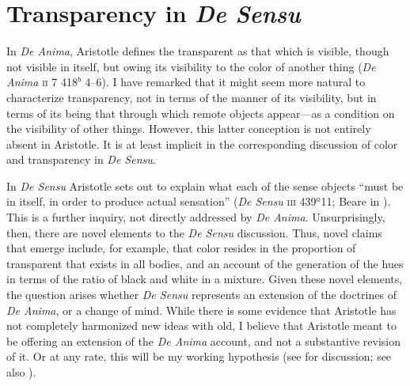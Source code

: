 
\section{Transparency in \emph{De Sensu}} %
\label{sec:transparency_in_de_sensu}

In \emph{De Anima}, Aristotle defines the transparent as that which is visible, though not visible in itself, but owing its visibility to the color of another thing (\emph{De Anima} \textsc{ii} 7 418\( ^{b} \) 4--6). I have remarked that it might seem more natural to characterize transparency, not in terms of the manner of its visibility, but in terms of its being that through which remote objects appear---as a condition on the visibility of other things. However, this latter conception is not entirely absent in Aristotle. It is at least implicit in the corresponding discussion of color and transparency in \emph{De Sensu}.

In \emph{De Sensu} Aristotle sets out to explain what each of the sense objects ``must be in itself, in order to produce actual sensation'' (\emph{De Sensu} \textsc{iii} 439\( ^{a} \)11; Beare in \citealt[7]{Barnes:1984uq}). This is a further inquiry, not directly addressed by \emph{De Anima}. Unsurprisingly, then, there are novel elements to the \emph{De Sensu} discussion. Thus, novel claims that emerge include, for example, that color resides in the proportion of transparent that exists in all bodies, and an account of the generation of the hues in terms of the ratio of black and white in a mixture. Given these novel elements, the question arises whether \emph{De Sensu} represents an extension of the doctrines of \emph{De Anima}, or a change of mind. While there is some evidence that Aristotle has not completely harmonized new ideas with old, I believe that Aristotle meant to be offering an extension of the \emph{De Anima} account, and not a substantive revision of it. Or at any rate, this will be my working hypothesis (see \citealt{Kahn:1966zr} for discussion; see also \citealt[291]{Caston:2005cr} \citealt[37]{Nussbaum:1995ly}).

